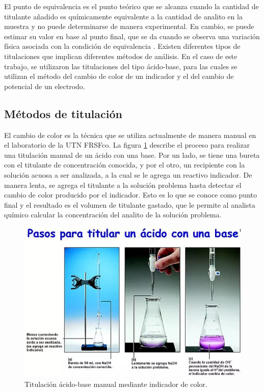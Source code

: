El punto de equivalencia es el punto teórico que se alcanza cuando la cantidad de titulante añadido es químicamente equivalente a la cantidad de analito
en la muestra y no puede determinarse de manera experimental. En cambio, se puede estimar su valor en base al punto final, que se da cuando se observa una variación física asociada con la condición de equivalencia \citep{BOOK:1}. Existen diferentes tipos de titulaciones que implican diferentes métodos de análisis. En el caso de este trabajo, se utilizaron las titulaciones del tipo ácido-base, para las cuales se utilizan el método del cambio de color de un indicador y el del cambio de potencial de un electrodo.

\subsection{Métodos de titulación}

El cambio de color es la técnica que se utiliza actualmente de manera manual en el laboratorio  de la UTN FRSFco. La figura \ref{fig:titManualColor} describe el proceso para realizar una titulación manual de un ácido con una base. Por un lado, se tiene una bureta con el titulante de concentración conocida, y por el otro, un recipiente con la solución acuosa a ser analizada, a la cual se le agrega un reactivo indicador. De manera lenta, se agrega el titulante a la solución problema hasta detectar el cambio de color producido por el indicador. Esto es lo que se conoce como punto final y el resultado es el volumen de titulante gastado, que le permite al analista químico calcular la concentración del analito de la solución problema.

\begin{figure}[htbp]
	\centering
	\includegraphics[width=.8\textwidth]{./Figures/titulacionManual.jpg}
	\caption{Titulación ácido-base manual mediante indicador de color\protect\footnotemark.}
	\label{fig:titManualColor}
\end{figure}

